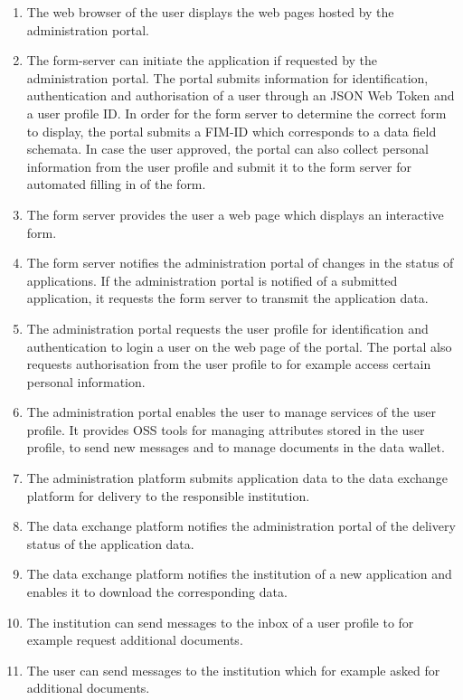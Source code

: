 \begin{enumerate}

    \item The web browser of the user displays the web pages hosted by the administration portal.

    \item The form-server can initiate the application if requested by the administration portal. The portal submits information for identification, authentication and authorisation of a user through an JSON Web Token and a user profile ID. In order for the form server to determine the correct form to display, the portal submits a FIM-ID which corresponds to a data field schemata. In case the user approved, the portal can also collect personal information from the user profile and submit it to the form server for automated filling in of the form.
    
    \item The form server provides the user a web page which displays an interactive form.
    
    \item The form server notifies the administration portal of changes in the status of applications. If the administration portal is notified of a submitted application, it requests the form server to transmit the application data.
    
    \item The administration portal requests the user profile for identification and authentication to login a user on the web page of the portal. The portal also requests authorisation from the user profile to for example access certain personal information.
    
    \item The administration portal enables the user to manage services of the user profile. It provides OSS tools for managing attributes stored in the user profile, to send new messages and to manage documents in the data wallet.
    
    \item The administration platform submits application data to the data exchange platform for delivery to the responsible institution.
    
    \item The data exchange platform notifies the administration portal of the delivery status of the application data.
    
    \item The data exchange platform notifies the institution of a new application and enables it to download the corresponding data.
    
    \item The institution can send messages to the inbox of a user profile to for example request additional documents.
    
    \item The user can send messages to the institution which for example asked for additional documents.
    
\end{enumerate}
    
